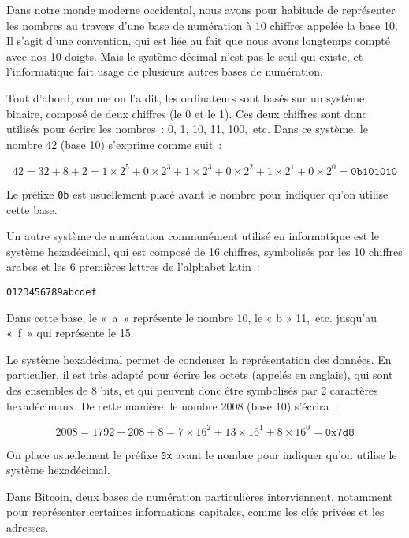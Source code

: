 Dans notre monde moderne occidental, nous avons pour habitude de représenter les nombres au travers d'une base de numération à 10 chiffres appelée la base 10. Il s'agit d'une convention, qui est liée au fait que nous avons longtemps compté avec nos 10 doigts. Mais le système décimal n'est pas le seul qui existe, et l'informatique fait usage de plusieurs autres bases de numération.

Tout d'abord, comme on l'a dit, les ordinateurs sont basés sur un système binaire, composé de deux chiffres (le 0 et le 1). Ces deux chiffres sont donc utilisés pour écrire les nombres~: 0, 1, 10, 11, 100,~etc. Dans ce système, le nombre 42 (base 10) s'exprime comme suit~:

\[
42 = 32 + 8 + 2 = 1 \times 2^5 + 0 \times 2^3 + 1 \times 2^3 + 0 \times 2^2 + 1 \times 2^1 + 0 \times 2^0 = \mathtt{0b101010}
\]

Le préfixe \texttt{0b} est usuellement placé avant le nombre pour indiquer qu'on utilise cette base.


Un autre système de numération communément utilisé en informatique est le système hexadécimal, qui est composé de 16 chiffres, symbolisés par les 10 chiffres arabes et les 6 premières lettres de l'alphabet latin~: 

\begin{Verbatim}[fontsize=\small]
0123456789abcdef
\end{Verbatim}

Dans cette base, le «~a~» représente le nombre 10, le « b » 11,~etc. jusqu'au «~f~» qui représente le 15.

Le système hexadécimal permet de condenser la représentation des données. En particulier, il est très adapté pour écrire les octets (appelés  en anglais), qui sont des ensembles de 8 bits, et qui peuvent donc être symbolisés par 2 caractères hexadécimaux. De cette manière, le nombre 2008 (base 10) s'écrira~:

\[
2008 = 1792 + 208 + 8 = 7 \times 16^2 + 13 \times 16^1 + 8 \times 16^0 = \mathtt{0x7d8}
\]

On place usuellement le préfixe \texttt{0x} avant le nombre pour indiquer qu'on utilise le système hexadécimal.


Dans Bitcoin, deux bases de numération particulières interviennent, notamment pour représenter certaines informations capitales, comme les clés privées et les adresses.

